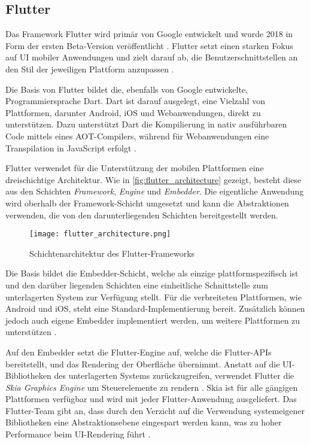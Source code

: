 \subsection{Flutter}
\label{sec:Frameworks_Flutter}

Das Framework Flutter wird primär von Google entwickelt und wurde 2018 in Form der ersten Beta-Version veröffentlicht \cite{Sharma_Flutter}.
Flutter setzt einen starken Fokus auf \ac{UI} mobiler Anwendungen und zielt darauf ab, die Benutzerschnittstellen an den Stil der jeweiligen Plattform anzupassen \cite{Flutter_Architektur}.


Die Basis von Flutter bildet die, ebenfalls von Google entwickelte, Programmiersprache Dart.
Dart ist darauf ausgelegt, eine Vielzahl von Plattformen, darunter Android, iOS und Webanwendungen, direkt zu unterstützen.
Dazu unterstützt Dart die Kompilierung in nativ ausführbaren Code mittels eines \ac{AOT}-Compilers, während für Webanwendungen eine Transpilation in JavaScript erfolgt \cite{Flutter_Architektur,Dart_Overview}.


Flutter verwendet für die Unterstützung der mobilen Plattformen eine dreischichtige Architektur.
Wie in \autoref{fig:flutter_architecture} gezeigt, besteht diese aus den Schichten \textit{Framework}, \textit{Engine} und \textit{Embedder}.
Die eigentliche Anwendung wird oberhalb der Framework-Schicht umgesetzt und kann die Abstraktionen verwenden, die von den darunterliegenden Schichten bereitgestellt werden.
\begin{figure}[h]
    \centering
    \texttt{[image: flutter\_architecture.png]}
    \caption{Schichtenarchitektur des Flutter-Frameworks \cite{Flutter_Architektur}}
    \label{fig:flutter_architecture}
\end{figure}


Die Basis bildet die Embedder-Schicht, welche als einzige plattformspezifisch ist und den darüber liegenden Schichten eine einheitliche Schnittstelle zum unterlagerten System zur Verfügung stellt.
Für die verbreiteten Plattformen, wie Android und iOS, steht eine Standard-Implementierung bereit.
Zusätzlich können jedoch auch eigene Embedder implementiert werden, um weitere Plattformen zu unterstützen \cite{Flutter_Architektur}.


Auf den Embedder setzt die Flutter-Engine auf, welche die Flutter-\acp{API} bereitstellt, und das Rendering der Oberfläche übernimmt.
Anstatt auf die \ac{UI}-Bibliotheken des unterlagerten Systems zurückzugreifen, verwendet Flutter die \textit{Skia Graphics Engine} um Steuerelemente zu rendern \cite{Biorn-Hansen_PerformanceOverhead_CrossPlatform}.
Skia ist für alle gängigen Plattformen verfügbar und wird mit jeder Flutter-Anwendung ausgeliefert.
Das Flutter-Team gibt an, dass durch den Verzicht auf die Verwendung systemeigener Bibliotheken eine Abstraktionsebene eingespart werden kann, was zu hoher Performance beim \ac{UI}-Rendering führt \cite{Flutter_Architektur}.


